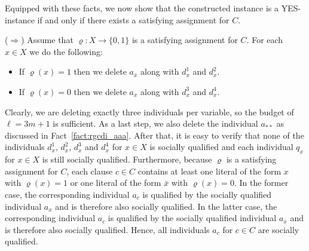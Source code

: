 \documentclass[
    12pt,               %
    a4paper,            %
    bibtotoc,           %
    pointlessnumbers,   %
    ngerman,            %
    titlepage,          %
    leqno,              %
    ]{scrarticle}       %
\newcommand\factref{Fact~\ref}
\begin{document}
\begin{Proof}
Equipped with these facts, we now show that the constructed instance is a YES-instance if and only if there exists a satisfying assignment for $C$.

($\Rightarrow$) Assume that $\varrho : X \rightarrow \{0, 1\}$ is a satisfying assignment for $C$. For each $x \in X$ we do the following:
\begin{itemize}[nolistsep, topsep=-1.25em]
\item
If $\varrho(x) = 1$ then we delete $a_{\bar{x}}$ along with $d_x^1$ and $d_x^2$.
\item
If $\varrho(x) = 0$ then we delete $a_x$ along with $d_x^3$ and $d_x^4$.
\end{itemize}
Clearly, we are deleting exactly three individuals per variable, so the budget of $\ell = 3m+1$ is sufficient. As a last step, we also delete the individual $a_{\ast\ast}$ as discussed in \factref{fact:rgcdi_aaa}. After that, it is easy to verify that none of the individuals $d_x^1$, $d_x^2$, $d_x^3$ and $d_x^4$ for $x \in X$ is socially qualified and each individual $q_x$ for $x \in X$ is still socially qualified. Furthermore, because $\varrho$ is a satisfying assignment for $C$, each clause $c \in C$ contains at least one literal of the form $x$ with $\varrho(x) = 1$ or one literal of the form $\bar{x}$ with $\varrho(x) = 0$. In the former case, the corresponding individual $a_c$ is qualified by the socially qualified individual $a_x$ and is therefore also socially qualified. In the latter case, the corresponding individual $a_c$ is qualified by the socially qualified individual $a_{\bar{x}}$ and is therefore also socially qualified. Hence, all individuals $a_c$ for $c \in C$ are socially qualified.


\end{Proof}
\end{document}
